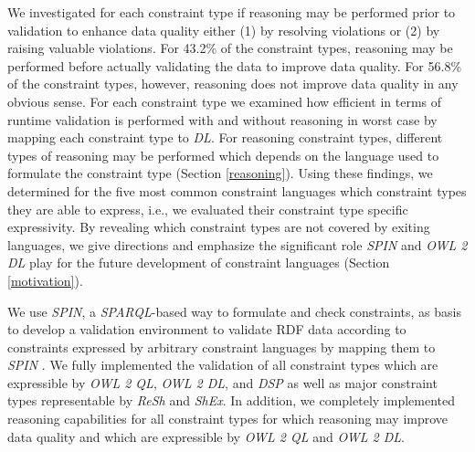 \documentclass{acm_proc_article-sp}
\begin{document}
We investigated for each constraint type if reasoning may be performed prior to validation to enhance data quality
either (1) by resolving violations or (2) by raising valuable violations.
For 43.2\% of the constraint types, reasoning may be performed before actually validating the data to improve data quality.
For 56.8\% of the constraint types, however, reasoning does not improve data quality in any obvious sense.
For each constraint type we examined how efficient in terms of runtime validation is performed with and without reasoning in worst case by mapping each constraint type to \emph{DL}.
For reasoning constraint types, different types of reasoning may be performed
which depends on the language used to formulate the constraint type (Section \ref{reasoning}).
Using these findings, we determined for the five most common constraint languages which constraint types they are able to express, i.e., we evaluated their constraint type specific expressivity.
By revealing which constraint types are not covered by exiting languages, 
we give directions and emphasize the significant role \emph{SPIN} and \emph{OWL 2 DL} play for the future development of constraint languages (Section \ref{motivation}).

We use \emph{SPIN}, 
a \emph{SPARQL}-based way to formulate and check constraints, as basis to develop a
validation environment to validate RDF data according to constraints expressed by arbitrary constraint languages by mapping them to \emph{SPIN} \cite{BoschEckert2014-2}.
We fully implemented the validation of all constraint types which are expressible by \emph{OWL 2 QL}, \emph{OWL 2 DL}, and \emph{DSP} 
as well as major constraint types representable by \emph{ReSh} and \emph{ShEx}.
In addition, we completely implemented reasoning capabilities for all constraint types for which reasoning may improve data quality and which are expressible by \emph{OWL 2 QL} and \emph{OWL 2 DL}.
\end{document}

